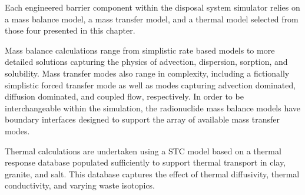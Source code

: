 Each engineered barrier component within the \Cyder disposal system simulator 
relies on a mass balance model, a mass transfer model, and a thermal model 
selected from those four presented in this chapter. 

Mass balance calculations range from simplistic rate based models to more 
detailed solutions capturing the physics of advection, dispersion, sorption, 
and solubility.  Mass transfer modes also range in complexity, including a 
fictionally simplistic forced transfer mode as well as modes capturing 
advection dominated, diffusion dominated, and coupled flow, respectively.  In 
order to be interchangeable within the simulation, the radionuclide mass 
balance models have boundary interfaces designed to support the array of 
available mass transfer modes. 

Thermal calculations are undertaken using a  \gls{STC} model based 
on a thermal response database populated sufficiently to support thermal 
transport in clay, granite, and salt. This database captures the effect of 
thermal diffusivity, thermal conductivity, and varying waste isotopics.
